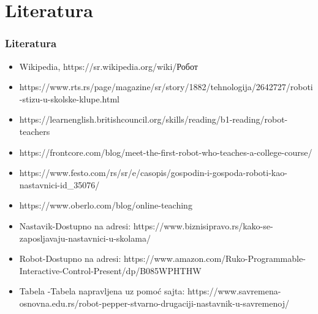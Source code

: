 \documentclass[10pt]{beamer}
\begin{document}
\section{Literatura}
\begin{frame}[fragile]\frametitle{Literatura}
      \begin{itemize}	
            \scriptsize \item  Wikipedia, https://sr.wikipedia.org/wiki/Робот
            \scriptsize \item https://www.rts.rs/page/magazine/sr/story/1882/tehnologija/2642727/roboti-stizu-u-skolske-klupe.html
            \scriptsize \item  https://learnenglish.britishcouncil.org/skills/reading/b1-reading/robot-teachers
            \scriptsize \item  https://frontcore.com/blog/meet-the-first-robot-who-teaches-a-college-course/
            \scriptsize \item https://www.festo.com/rs/sr/e/casopis/gospodin-i-gospoda-roboti-kao-nastavnici-id\_35076/
            \scriptsize \item https://www.oberlo.com/blog/online-teaching
            \scriptsize \item{Nastavik-}Dostupno na adresi: https://www.biznisipravo.rs/kako-se-zaposljavaju-nastavnici-u-skolama/
            \scriptsize \item{Robot-}Dostupno na adresi: https://www.amazon.com/Ruko-Programmable-Interactive-Control-Present/dp/B085WPHTHW
            \scriptsize \item{Tabela -}Tabela napravljena uz pomoć sajta: https://www.savremena-osnovna.edu.rs/robot-pepper-stvarno-drugaciji-nastavnik-u-savremenoj/
	\end{itemize}
\end{frame}
\end{document}
